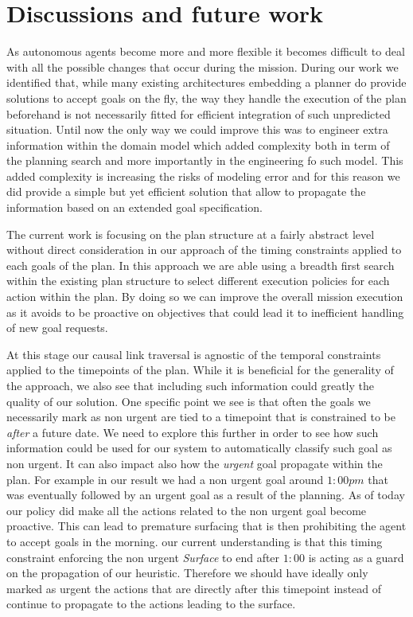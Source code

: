 \section{Discussions and future work}
\label{sec:conclude}

As autonomous agents become more and more flexible it becomes difficult
to deal with all the possible changes that occur during the
mission. During our work we identified that, while many existing 
architectures embedding a planner do provide solutions to accept goals
on the fly, the way they handle the execution of the plan beforehand
is not necessarily fitted for efficient integration of such unpredicted
situation. Until now the only way we could improve this was to engineer
extra information within the domain model which added complexity both in
term of the planning search and more importantly in the engineering fo
such model. This added complexity is increasing the risks of modeling
error and for this reason we did provide a simple but yet efficient
solution that allow to propagate the information based on an extended
goal specification. 


The current work is focusing on the plan  structure at a fairly
abstract level without direct consideration in our approach of the
timing constraints applied to each goals of the plan. In this approach
we are able using a breadth first search within the existing plan
structure to select different execution policies for each action
within the plan. By doing so we can improve the overall mission 
execution as it avoids to be proactive on objectives that could lead it
to inefficient handling of new goal requests.

At this stage our causal link traversal is agnostic of the temporal 
constraints applied to the timepoints of the plan. While it is
beneficial for the generality of the approach, we also see that
including such information could greatly the quality of our solution. 
One specific point we see is that often the goals we necessarily mark
as non urgent are tied to a timepoint that is constrained to be {\em
  after} a future date. We need to explore this further in order to
see how such information could be used for our system to automatically
classify such goal as non urgent. It can also impact  also how the
{\em urgent} goal propagate within the plan. For example in our result
we had a non urgent goal around $1:00 pm$ that was eventually 
followed by an urgent goal as a result of the planning. As of today 
our policy did make all the actions related to the non urgent goal 
become proactive. This can lead to premature surfacing that is then 
prohibiting the agent to accept goals in the morning. our current
understanding is that this timing constraint enforcing the non
urgent {\em Surface} to end after $1:00$ is acting as a guard on the
propagation of our heuristic. Therefore we should have ideally only
marked as urgent the actions that are directly after this timepoint
instead of continue to propagate to the actions leading to the
surface. 


